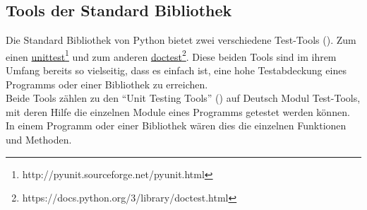 \subsection{Tools der Standard Bibliothek}\label{python-tools:stdlib}

Die Standard Bibliothek von Python bietet zwei verschiedene Test-Tools (\cite{wiki.python:PythonTestingToolsTaxonomy}).
Zum einen
\href{http://pyunit.sourceforge.net/pyunit.html}{unittest}\footnote{http://pyunit.sourceforge.net/pyunit.html}
und zum anderen
\href{https://docs.python.org/3/library/doctest.html}{doctest}\footnote{https://docs.python.org/3/library/doctest.html}.
Diese beiden Tools sind im ihrem Umfang bereits so vielseitig, dass es einfach 
ist, eine hohe Testabdeckung eines Programms oder einer Bibliothek zu erreichen.
\newline
\\
Beide Tools zählen zu den "`Unit Testing Tools"' (\cite{wiki.python:PythonTestingToolsTaxonomy})
auf Deutsch Modul Test-Tools, mit deren Hilfe die einzelnen Module eines Programms
getestet werden können. In einem Programm oder einer Bibliothek wären dies die einzelnen
Funktionen und Methoden.



